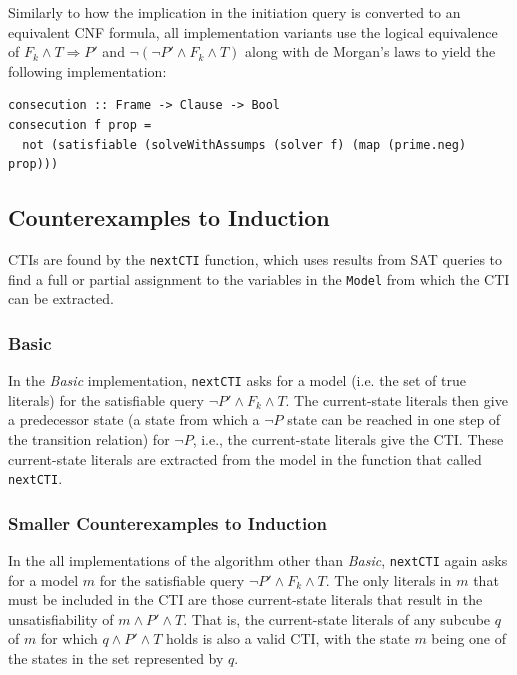 \documentclass[12pt,a4paper,twoside,openright]{report}
\begin{document}
{Similarly to how the implication in the initiation query is converted to an equivalent CNF
formula, all implementation variants use the logical equivalence of
$F_k \wedge T \Rightarrow P'$ and $\neg (\neg P' \wedge F_k \wedge T)$ along with de Morgan's
laws to yield the following implementation:
\begin{lstlisting}
consecution :: Frame -> Clause -> Bool
consecution f prop =
  not (satisfiable (solveWithAssumps (solver f) (map (prime.neg) prop)))
\end{lstlisting}

\subsection{Counterexamples to Induction}

CTIs are found by the \verb,nextCTI, function, which
uses results from SAT queries to find a full or partial assignment to
the variables in the \verb,Model, from which the CTI can be extracted.

\subsubsection{Basic}
In the \emph{Basic} implementation, \verb,nextCTI, asks for a model
(i.e. the set of true literals) for the satisfiable query $\neg P' \wedge F_k \wedge T$.
The current-state literals then give a predecessor state (a state from which
a $\neg P$ state can be reached in one step of the transition relation) for $\neg P$,
i.e., the current-state literals give the CTI.
These current-state literals are extracted from the model in the function that
called \verb,nextCTI,.

\subsubsection{Smaller Counterexamples to Induction}
In the all implementations of the algorithm other than {\it Basic},
\verb,nextCTI, again asks for a model $m$
for the satisfiable query $\neg P' \wedge F_k \wedge T$. The only literals in $m$ that
must be included in the CTI are those current-state literals that result in
the unsatisfiability of $m \wedge P' \wedge T$. That is, the current-state literals of any
subcube $q$ of $m$ for which $q \wedge P' \wedge T$ holds is also a valid CTI, with
the state $m$ being one of the states in the set represented by $q$.

}
\end{document}
